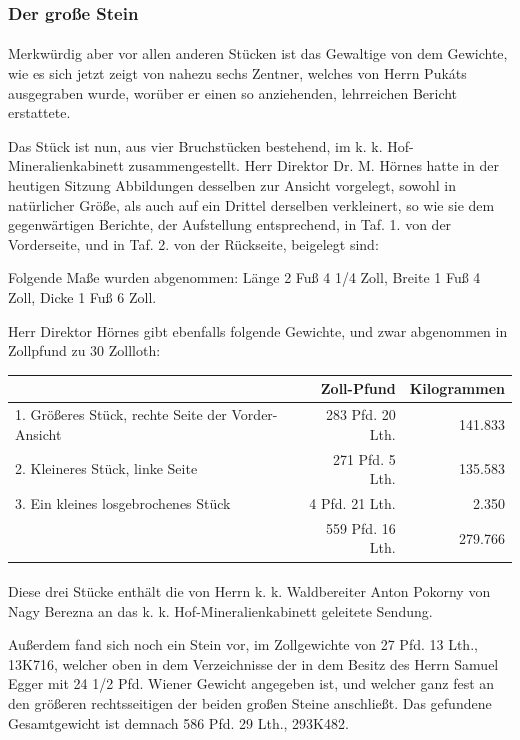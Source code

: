 \documentclass[a4paper, 11pt, oneside, german]{article}
\begin{document}
\subsubsection{Der große Stein}
\paragraph{}
Merkwürdig aber vor allen anderen Stücken ist das Gewaltige von dem Gewichte, wie es sich jetzt zeigt von nahezu sechs Zentner, welches von Herrn Pukáts ausgegraben wurde, worüber er einen so anziehenden, lehrreichen Bericht erstattete.

Das Stück ist nun, aus vier Bruchstücken bestehend, im k. k. Hof-Mineralienkabinett zusammengestellt. Herr Direktor Dr. M. Hörnes hatte in der heutigen Sitzung Abbildungen desselben zur Ansicht vorgelegt, sowohl in natürlicher Größe, als auch auf ein Drittel derselben verkleinert, so wie sie dem gegenwärtigen Berichte, der Aufstellung entsprechend, in Taf. 1. von der Vorderseite, und in Taf. 2. von der Rückseite, beigelegt sind:

Folgende Maße wurden abgenommen: Länge 2 Fuß 4 1/4 Zoll, Breite 1 Fuß 4 Zoll, Dicke 1 Fuß 6 Zoll.

Herr Direktor Hörnes gibt ebenfalls folgende Gewichte, und zwar abgenommen in Zollpfund zu 30 Zollloth:
\begin{table}[H]
    \centering\small
    \begin{tabular}{|l|r|r|}
    \hline
        ~ & \textbf{Zoll-Pfund} & \textbf{Kilogrammen} \\ \hline
        1. Größeres Stück, rechte Seite der Vorder-Ansicht & 283 Pfd. 20 Lth. & 141.833 \\ \hline
        2. Kleineres Stück, linke Seite & 271 Pfd. 5 Lth. & 135.583 \\ \hline
        3. Ein kleines losgebrochenes Stück & 4 Pfd. 21 Lth. & 2.350 \\ \hline
        ~ & 559 Pfd. 16 Lth. & 279.766 \\ \hline
    \end{tabular}
\end{table}
\paragraph{}
Diese drei Stücke enthält die von Herrn k. k. Waldbereiter Anton Pokorny von Nagy Berezna an das k. k. Hof-Mineralienkabinett geleitete Sendung.

Außerdem fand sich noch ein Stein vor, im Zollgewichte von 27 Pfd. 13 Lth., 13K716, welcher oben in dem Verzeichnisse der in dem Besitz des Herrn Samuel Egger mit 24 1/2 Pfd. Wiener Gewicht angegeben ist, und welcher ganz fest an den größeren rechtsseitigen der beiden großen Steine anschließt. Das gefundene Gesamtgewicht ist demnach 586 Pfd. 29 Lth., 293K482.
\end{document}
